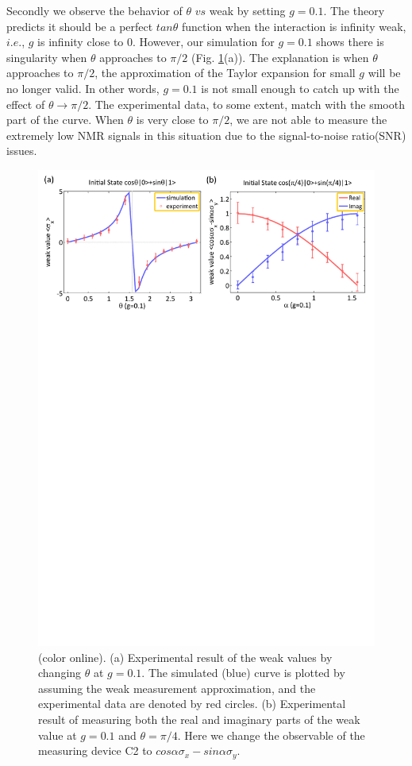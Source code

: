 \documentclass[aps,pra,12pt,onecolumn,showpacs,superscriptaddress,floatfix,footinbib,subfigure]{revtex4}
\begin{document}
Secondly we observe the behavior of $\theta$ $vs$ weak by setting $g=0.1$. The theory predicts it should be a perfect $tan\theta$ function when the interaction is infinity weak, $i.e.$, $g$ is infinity close to 0. However, our simulation for $g=0.1$ shows there is singularity when $\theta$ approaches to $\pi/2$ (Fig. \ref{thetaweak}(a)). The explanation is when $\theta$ approaches to $\pi/2$, the approximation of the Taylor expansion for small $g$ will be no longer valid. In other words, $g=0.1$ is not small enough to catch up with the effect of $\theta \rightarrow \pi/2$. The experimental data, to some extent, match with the smooth part of the curve. When $\theta$ is very close to  $\pi/2$, we are not able to measure the extremely low NMR signals in this situation due to the signal-to-noise ratio(SNR) issues.

\begin{figure}[h] \centering
\includegraphics[width=\columnwidth]{thetaweak.pdf}
\caption{(color online). (a) Experimental result of the weak values by changing $\theta$ at $g=0.1$. The simulated (blue) curve is plotted by assuming the weak measurement approximation, and the experimental data are denoted by red circles. (b) Experimental result of measuring both the real and imaginary parts of the weak value at $g=0.1$ and $\theta = \pi/4$. Here we change the observable of the measuring device C2 to $cos\alpha \sigma_x - sin\alpha \sigma_y$.}\label{thetaweak}
\end{figure}
\end{document}

